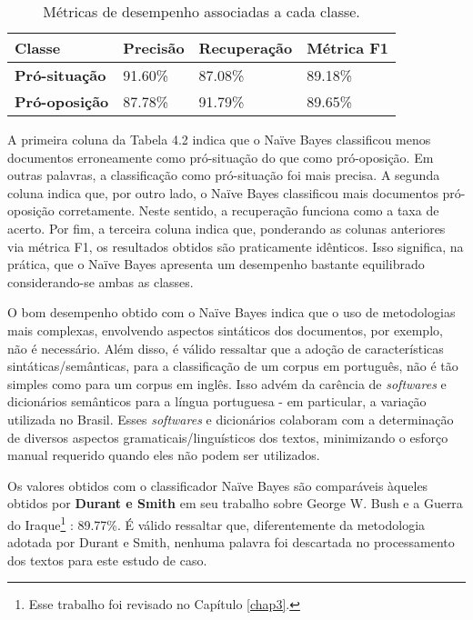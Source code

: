 
\begin{table}[h]
\centering
\begin{tabular}{| l | l | l | l | }
\hline

\textbf{Classe} & \textbf{Precisão} & \textbf{Recuperação} & \textbf{Métrica F1} \\ \hline

\textbf{Pró-situação} & 91.60\% & 87.08\% & 89.18\% \\ \hline
\textbf{Pró-oposição} & 87.78\% & 91.79\% & 89.65\% \\ \hline
\end{tabular}
\label{resultados}
\caption{Métricas de desempenho associadas a cada classe.}
\end{table}

A primeira coluna da Tabela 4.2 indica que o Naïve Bayes classificou menos documentos erroneamente como pró-situação do que como pró-oposição. Em outras palavras, a classificação como pró-situação foi mais precisa. A segunda coluna indica que, por outro lado, o Naïve Bayes classificou mais documentos pró-oposição corretamente. Neste sentido, a recuperação funciona como a taxa de acerto. Por fim, a terceira coluna indica que, ponderando as colunas anteriores via métrica F1, os resultados obtidos são praticamente idênticos. Isso significa, na prática, que o Naïve Bayes apresenta um desempenho bastante equilibrado considerando-se ambas as classes. 

O bom desempenho obtido com o Naïve Bayes indica que o uso de metodologias mais complexas, envolvendo aspectos sintáticos dos documentos, por exemplo, não é necessário. Além disso, é válido ressaltar que a adoção de características sintáticas/semânticas, para a classificação de um corpus em português, não é tão simples como para um corpus em inglês. Isso advém  da carência de \emph{softwares} e dicionários semânticos para a língua portuguesa - em particular, a variação utilizada no Brasil. Esses \emph{softwares} e dicionários colaboram com a determinação de diversos aspectos gramaticais/linguísticos dos textos, minimizando o esforço manual requerido quando eles não podem ser utilizados.


Os valores obtidos com o classificador Naïve Bayes são comparáveis àqueles obtidos por \textbf{Durant e Smith} em seu trabalho sobre George W. Bush e a Guerra do Iraque\footnote{Esse trabalho foi revisado no Capítulo \ref{chap3}.} \cite{durant-smith}: 89.77\%. É válido ressaltar que, diferentemente da metodologia adotada por Durant e Smith, nenhuma palavra foi descartada no processamento dos textos para este estudo de caso.  

